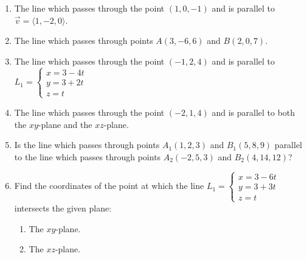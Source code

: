 \documentclass[12pt]{article}
\newif\ifans
\begin{document}
\begin{enumerate}

\item The line which passes through the point $(1,0,-1)$  and is parallel to $\overrightarrow{v}=\langle 1,-2,0\rangle$.

\ifans{\fbox{$x=1+t, y=-2t, z=-1$}} \fi

\item The line which passes through points $A(3,-6,6)$ and $B(2,0,7)$.

\ifans{\fbox{$x=3-t,y=-6+6t,z=6+t$}} \fi

\item The line which passes through the point $(-1,2,4)$ and is parallel to $L_1=\left\{\begin{array}{l}
x=3-4t\\
y=3+2t\\
z=t\end{array}\right.$

\ifans{\fbox{$x=-1-4t,y=2+2t,z=4+t$}} \fi

\item The line which passes through the point $(-2,1,4)$ and is parallel to both the $xy$-plane and the $xz$-plane.

\ifans{\fbox{$x=-2+t,y=1,z=4$; Detailed Solution: \textcolor{blue}{\href{http://www.math.drexel.edu/classes/Calculus/resources/Math200HW/Solutions/05_200_Lines_04.pdf}{Here}}}} \fi

\item Is the line which passes through points $A_1(1,2,3)$ and $B_1(5,8,9)$ parallel to the line which passes through points $A_2(-2,5,3)$ and $B_2(4,14,12)$?

\ifans{\fbox{Yes.}} \fi

\item Find the coordinates of the point at which the line $L_1=\left\{\begin{array}{l}
x=3-6t\\
y=3+3t\\
z=t\end{array}\right.$ intersects the given plane:

\begin{enumerate}

\item The $xy$-plane.

\ifans{\fbox{$(x,y,z)=(3,3,0)$}} \fi

\item The $xz$-plane.

\ifans{\fbox{$(x,y,z)=(9,0,-1)$}} \fi


\end{enumerate}
\end{enumerate}
\end{document}
